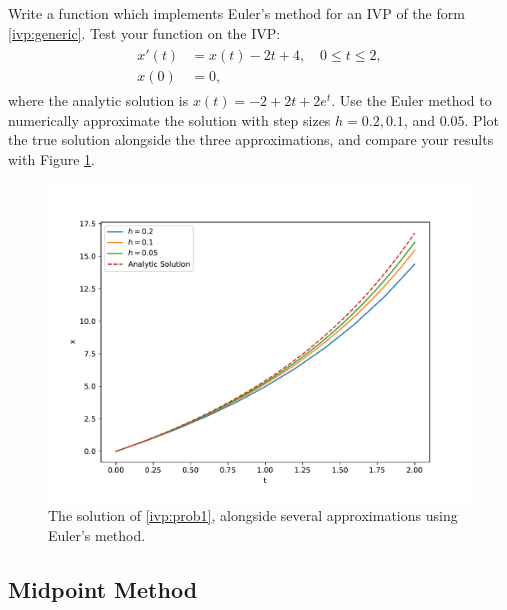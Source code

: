 \begin{problem} Write a function which implements Euler's method for an IVP of the form \eqref{ivp:generic}. Test your function on the IVP:
\begin{align}
	\begin{split}
		x' (t)&= x(t) - 2t + 4,\quad 0 \leq t \leq 2, \\
		x(0) &= 0,
	\end{split}\label{ivp:prob1}
\end{align}
where the analytic solution is $x(t) = -2+2t + 2e^t.$
Use the Euler method to numerically approximate the solution with step sizes $h = 0.2, 0.1$, and $0.05.$ Plot the true solution alongside the three approximations, and compare your results with Figure \ref{ivp:euler}.
\end{problem}

\begin{figure}[H]
\centering
\includegraphics[width=150mm]{euler.pdf}
\caption{The solution of \eqref{ivp:prob1}, alongside several approximations using Euler's method.}
\label{ivp:euler}
\end{figure}

\subsection*{Midpoint Method}


